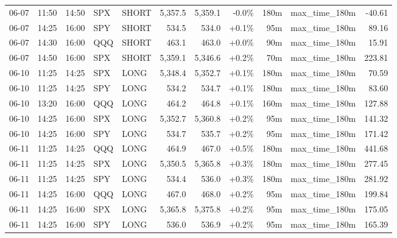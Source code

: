 \documentclass[11pt,a4paper,twoside]{article}
\begin{document}
\begin{center}
\begin{longtable}{>{\color{txtmain}}l l l l l r r r r >{\color{txtmain}}l r}
06-07 & 11:50 & 14:50 & SPX & SHORT & 5,357.5 & 5,359.1 & \textcolor{lossred}{-0.0\%} & 180m & max\_time\_180m & \textcolor{lossred}{-40.61} \\
06-07 & 14:25 & 16:00 & SPY & SHORT & 534.5 & 534.0 & \textcolor{wingreen}{+0.1\%} & 95m & max\_time\_180m & \textcolor{wingreen}{89.16} \\
06-07 & 14:30 & 16:00 & QQQ & SHORT & 463.1 & 463.0 & \textcolor{wingreen}{+0.0\%} & 90m & max\_time\_180m & \textcolor{wingreen}{15.91} \\
06-07 & 14:50 & 16:00 & SPX & SHORT & 5,359.1 & 5,346.6 & \textcolor{wingreen}{+0.2\%} & 70m & max\_time\_180m & \textcolor{wingreen}{223.81} \\
06-10 & 11:25 & 14:25 & SPX & LONG & 5,348.4 & 5,352.7 & \textcolor{wingreen}{+0.1\%} & 180m & max\_time\_180m & \textcolor{wingreen}{70.59} \\
06-10 & 11:25 & 14:25 & SPY & LONG & 534.2 & 534.7 & \textcolor{wingreen}{+0.1\%} & 180m & max\_time\_180m & \textcolor{wingreen}{83.60} \\
06-10 & 13:20 & 16:00 & QQQ & LONG & 464.2 & 464.8 & \textcolor{wingreen}{+0.1\%} & 160m & max\_time\_180m & \textcolor{wingreen}{127.88} \\
06-10 & 14:25 & 16:00 & SPX & LONG & 5,352.7 & 5,360.8 & \textcolor{wingreen}{+0.2\%} & 95m & max\_time\_180m & \textcolor{wingreen}{141.32} \\
06-10 & 14:25 & 16:00 & SPY & LONG & 534.7 & 535.7 & \textcolor{wingreen}{+0.2\%} & 95m & max\_time\_180m & \textcolor{wingreen}{171.42} \\
06-11 & 11:25 & 14:25 & QQQ & LONG & 464.9 & 467.0 & \textcolor{wingreen}{+0.5\%} & 180m & max\_time\_180m & \textcolor{wingreen}{441.68} \\
06-11 & 11:25 & 14:25 & SPX & LONG & 5,350.5 & 5,365.8 & \textcolor{wingreen}{+0.3\%} & 180m & max\_time\_180m & \textcolor{wingreen}{277.45} \\
06-11 & 11:25 & 14:25 & SPY & LONG & 534.4 & 536.0 & \textcolor{wingreen}{+0.3\%} & 180m & max\_time\_180m & \textcolor{wingreen}{281.92} \\
06-11 & 14:25 & 16:00 & QQQ & LONG & 467.0 & 468.0 & \textcolor{wingreen}{+0.2\%} & 95m & max\_time\_180m & \textcolor{wingreen}{199.84} \\
06-11 & 14:25 & 16:00 & SPX & LONG & 5,365.8 & 5,375.8 & \textcolor{wingreen}{+0.2\%} & 95m & max\_time\_180m & \textcolor{wingreen}{175.05} \\
06-11 & 14:25 & 16:00 & SPY & LONG & 536.0 & 536.9 & \textcolor{wingreen}{+0.2\%} & 95m & max\_time\_180m & \textcolor{wingreen}{165.39} \\

\end{longtable}
\end{center}
\end{document}
